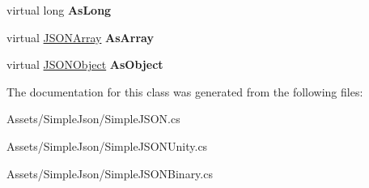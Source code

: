 \begin{DoxyCompactItemize}
\item 
virtual long {\bfseries As\+Long}\hypertarget{classSimpleJSON_1_1JSONNode_adadf4534e86b46029690b715a2e2ae2f}{}\label{classSimpleJSON_1_1JSONNode_adadf4534e86b46029690b715a2e2ae2f}

\item 
virtual \hyperlink{classSimpleJSON_1_1JSONArray}{J\+S\+O\+N\+Array} {\bfseries As\+Array}\hypertarget{classSimpleJSON_1_1JSONNode_a5cabad97e7187a09ea7581f1cb30cb75}{}\label{classSimpleJSON_1_1JSONNode_a5cabad97e7187a09ea7581f1cb30cb75}

\item 
virtual \hyperlink{classSimpleJSON_1_1JSONObject}{J\+S\+O\+N\+Object} {\bfseries As\+Object}\hypertarget{classSimpleJSON_1_1JSONNode_ae77298ed6cea74259c6d3c35479a3f0c}{}\label{classSimpleJSON_1_1JSONNode_ae77298ed6cea74259c6d3c35479a3f0c}

\end{DoxyCompactItemize}


The documentation for this class was generated from the following files\+:\begin{DoxyCompactItemize}
\item 
Assets/\+Simple\+Json/Simple\+J\+S\+O\+N.\+cs\item 
Assets/\+Simple\+Json/Simple\+J\+S\+O\+N\+Unity.\+cs\item 
Assets/\+Simple\+Json/Simple\+J\+S\+O\+N\+Binary.\+cs\end{DoxyCompactItemize}
